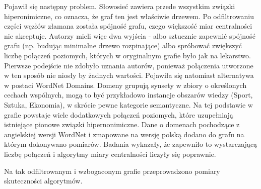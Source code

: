 Pojawił się następny problem. Słowosieć zawiera przede wszystkim związki hiperonimiczne, co oznacza, że graf ten jest właściwie drzewem. Po odfiltrowaniu części węzłów złamana została spójność grafu, czego większość miar centralności nie akceptuje. Autorzy mieli więc dwa wyjścia - albo sztucznie zapewnić spójność grafu (np. budując minimalne drzewo rozpinające) albo spróbować zwiększyć liczbę połączeń poziomych, których w oryginalnym grafie było jak na lekarstwo. Pierwsze podejście nie zdobyło uznania autorów, ponieważ połączenia utworzone w ten sposób nie niosły by żadnych wartości. Pojawiła się natomiast alternatywa w postaci WordNet Domains. Domeny grupują synsety w zbiory o określonych cechach wspólnych, mogą to być przykładowo instancje obszarów wiedzy (Sport, Sztuka, Ekonomia), w skrócie pewne kategorie semantyczne. Na tej podstawie w grafie powstaje wiele dodatkowych połączeń poziomych, które uzupełniają istniejące pionowe związki hipernonimiczne. Dane o domenach pochodzące z angielskiej wersji WordNet i zmapowane na wersję polską dodano do grafu na którym dokonywano pomiarów. Badania wykazały, że zapewniło to wystarczającą liczbę połączeń i algorytmy miary centralności liczyły się poprawnie.

Na tak odfiltrowanym i wzbogaconym grafie przeprowadzono pomiary skuteczności algorytmów.